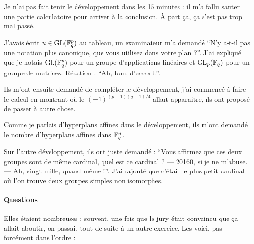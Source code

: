\documentclass[a4paper, 11pt]{article}
\begin{document}
Je n'ai pas fait tenir le développement dans les 15 minutes : il m'a fallu
sauter une partie calculatoire pour arriver à la conclusion. À part ça, ça s'est
pas trop mal passé.

J'avais écrit $u \in \mathrm{GL}(\mathbb{F}_q^p)$ au tableau, un examinateur m'a demandé
\enquote{N'y a-t-il pas une notation plus canonique, que vous utilisez dans
  votre plan ?}. J'ai expliqué que je notais $\mathrm{GL}(\mathbb{F}_q^p)$ pour un groupe
d'applications linéaires et $\mathrm{GL}_p(\mathbb{F}_q)$ pour un groupe de matrices. Réaction :
\enquote{Ah, bon, d'accord.}.

Ils m'ont ensuite demandé de compléter le développement, j'ai commencé à
faire le calcul en montrant où le $(-1)^{(p-1)(q-1)/4}$ allait apparaître, ils
ont proposé de passer à autre chose.

Comme je parlais d'hyperplans affines dans le développement, ils m'ont demandé
le nombre d'hyperplans affines dans $\mathbb{F}_q^n$.

Sur l'autre développement, ils ont juste demandé : \enquote{Vous affirmez que
  ces deux groupes sont de même cardinal, quel est ce cardinal ? --- 20160, si
  je ne m'abuse. --- Ah, vingt mille, quand même !}. J'ai rajouté que c'était le
plus petit cardinal où l'on trouve deux groupes simples non isomorphes.

\paragraph{Questions}

Elles étaient nombreuses ; souvent, une fois que le jury était convaincu que ça
allait aboutir, on passait tout de suite à un autre exercice. Les voici, pas
forcément dans l'ordre :
\end{document}

